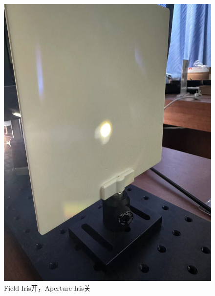 \documentclass{ctexart}
\begin{document}
\begin{figure}[H]
\begin{minipage}[b]{0.2\textwidth}
    \includegraphics[width=\textwidth]{pictures/微信图片_20241010201022.jpg}
    \caption{Field Iris开，Aperture Iris关}
  \end{minipage}
  \begin{minipage}[b]{0.2\textwidth}
    \centering

\end{minipage}
\end{figure}
\end{document}
